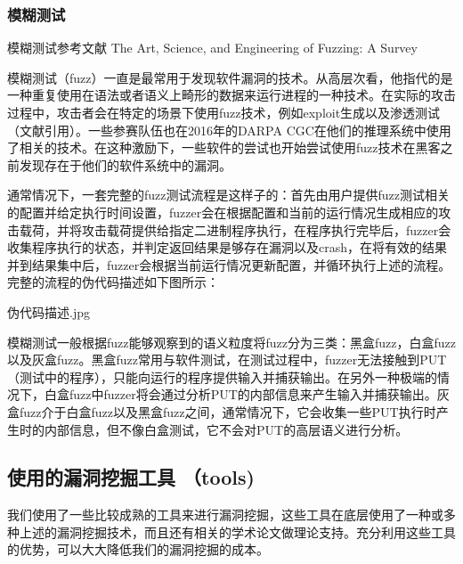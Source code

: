 \documentclass[doctor,privacy,twoside]{buaa_mac}
\begin{document}
\subsubsection{模糊测试}
模糊测试参考文献 The Art, Science, and Engineering of Fuzzing: A Survey

模糊测试（fuzz）一直是最常用于发现软件漏洞的技术。从高层次看，他指代的是一种重复使用在语法或者语义上畸形的数据来运行进程的一种技术。在实际的攻击过程中，攻击者会在特定的场景下使用fuzz技术，例如exploit生成以及渗透测试（文献引用）。一些参赛队伍也在2016年的DARPA CGC在他们的推理系统中使用了相关的技术。在这种激励下，一些软件的尝试也开始尝试使用fuzz技术在黑客之前发现存在于他们的软件系统中的漏洞。

通常情况下，一套完整的fuzz测试流程是这样子的：首先由用户提供fuzz测试相关的配置并给定执行时间设置，fuzzer会在根据配置和当前的运行情况生成相应的攻击载荷，并将攻击载荷提供给指定二进制程序执行，在程序执行完毕后，fuzzer会收集程序执行的状态，并判定返回结果是够存在漏洞以及crash，在将有效的结果并到结果集中后，fuzzer会根据当前运行情况更新配置，并循环执行上述的流程。完整的流程的伪代码描述如下图所示：

伪代码描述.jpg

模糊测试一般根据fuzz能够观察到的语义粒度将fuzz分为三类：黑盒fuzz，白盒fuzz以及灰盒fuzz。黑盒fuzz常用与软件测试，在测试过程中，fuzzer无法接触到PUT（测试中的程序），只能向运行的程序提供输入并捕获输出。在另外一种极端的情况下，白盒fuzz中fuzzer将会通过分析PUT的内部信息来产生输入并捕获输出。灰盒fuzz介于白盒fuzz以及黑盒fuzz之间，通常情况下，它会收集一些PUT执行时产生时的内部信息，但不像白盒测试，它不会对PUT的高层语义进行分析。



\subsection{使用的漏洞挖掘工具 （tools)}
我们使用了一些比较成熟的工具来进行漏洞挖掘，这些工具在底层使用了一种或多种上述的漏洞挖掘技术，而且还有相关的学术论文做理论支持。充分利用这些工具的优势，可以大大降低我们的漏洞挖掘的成本。
\end{document}

